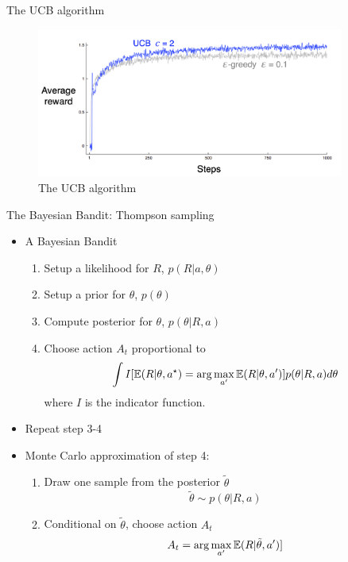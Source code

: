 \documentclass[10pt]{beamer}
\begin{document}
\begin{frame}{The UCB algorithm}

\begin{figure}[h]
\centering
\includegraphics[width=0.9\textwidth]{fig/sutton_fig_2_4.png}
\caption{The UCB algorithm}
\end{figure}

\end{frame}



\begin{frame}{The Bayesian Bandit: Thompson sampling}

\begin{itemize}
\item A Bayesian Bandit
\begin{enumerate}
\item Setup a likelihood for $R$, $p(R|a,\theta)$
\item Setup a prior for $\theta$, $p(\theta)$
\item Compute posterior for $\theta$, $p(\theta|R, a)$
\item Choose action $A_t$ proportional to
\[
\int I[\operatorname{\mathbb{E}}(R|\theta,a^\star) = \arg \max_{a'} \operatorname{\mathbb{E}}(R|\theta,a')] p(\theta|R,a) d\theta
\]
where $I$ is the indicator function.
\end{enumerate}
\item Repeat step 3-4 \pause
\item Monte Carlo approximation of step 4:
\begin{enumerate}
\item Draw one sample from the posterior $\tilde{\theta}$
\[
\tilde{\theta} \sim p(\theta|R, a)
\]
\item Conditional on $\tilde{\theta}$, choose action $A_t$
\[
A_t = \arg \max_{a'} \operatorname{\mathbb{E}}(R|\tilde{\theta},a')]
\]
\end{enumerate}

\end{itemize}

\end{frame}
\end{document}
